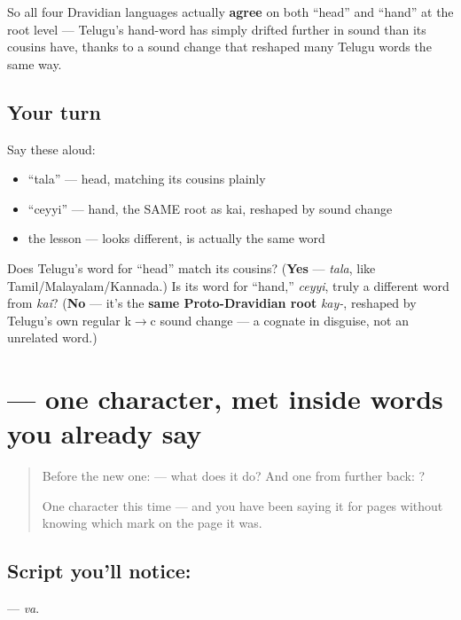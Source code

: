 So all four Dravidian languages actually \textbf{agree} on both \textquotedblleft{}head\textquotedblright{} and \textquotedblleft{}hand\textquotedblright{} at the root level — Telugu's hand-word has simply drifted further in sound than its cousins have, thanks to a sound change that reshaped many Telugu words the same way.

\subsection*{Your turn}
Say these aloud:

\begin{itemize}
\raggedright
  \item \textquotedblleft{}tala\textquotedblright{} — head, matching its cousins plainly
  \item \textquotedblleft{}ceyyi\textquotedblright{} — hand, the SAME root as kai, reshaped by sound change
  \item the lesson — looks different, is actually the same word
\end{itemize}

\begin{tcolorbox}[breakable,colback=teal!4,colframe=teal!35!black,title={Before you move on}]
Does Telugu's word for \textquotedblleft{}head\textquotedblright{} match its cousins? (\textbf{Yes} — \emph{tala}, like Tamil/Malayalam/Kannada.) Is its word for \textquotedblleft{}hand,\textquotedblright{} \emph{ceyyi}, truly a different word from \emph{kai}? (\textbf{No} — it's the \textbf{same Proto-Dravidian root} \emph{kay-}, reshaped by Telugu's own regular k$\to$c sound change — a cognate in disguise, not an unrelated word.)
\end{tcolorbox}
\section[\texorpdfstring{\te{వ} (va)}{వ (va)}]{ — one character, met inside words you already say}

\label{lesson:TE-S117-letter-va}



\begin{quote}
Before the new one:  — what does it do? And one from further back: ?

One character this time — and you have been saying it for pages without knowing which mark on the page it was.
\end{quote}

\subsection*{Script you'll notice: }
\textbf{} — \emph{va}.

